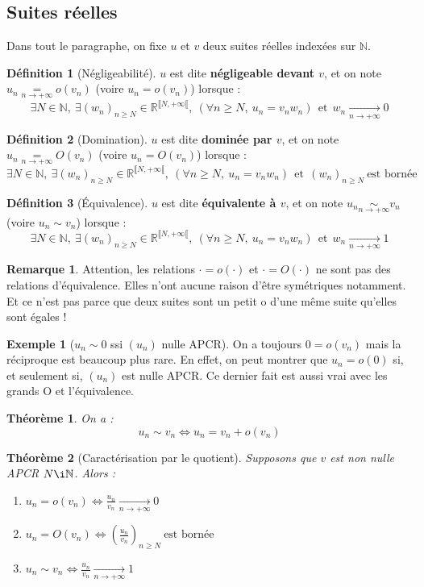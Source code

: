 \documentclass[french]{book}
\newcommand{\N}{\mathbb{N}}
\newcommand{\R}{\mathbb{R}}
\theoremstyle{plain}
\newtheorem{thm}{Théorème}[chapter]
\theoremstyle{definition}
\newtheorem{dfn}{Définition}[chapter]
\newtheorem{exa}{Exemple}[chapter]
\newtheorem{rmq}{Remarque}[chapter]
\theoremstyle{remark}
\begin{document}
\subsection{Suites réelles}
Dans tout le paragraphe, on fixe $u$ et $v$ deux suites réelles indexées sur $\N$.
\begin{dfn}[Négligeabilité]
	$u$ est dite \textbf{négligeable devant $v$}, et on note $u_n\underset{n\to+\infty}{=}o(v_n)$ (voire $u_n=o(v_n)$) lorsque : $$\exists N\in\N,\ \exists(w_n)_{n\geqslant N}\in\R^{\llbracket N,+\infty\llbracket},\ \left(\forall n\geqslant N,\ u_n=v_nw_n\right) \ \ \text{et} \ \ w_n\xrightarrow[n\to+\infty]{} 0$$
\end{dfn}
\begin{dfn}[Domination]
	$u$ est dite \textbf{dominée par $v$}, et on note $u_n\underset{n\to+\infty}{=}O(v_n)$ (voire $u_n=O(v_n)$) lorsque : $$\exists N\in\N,\ \exists(w_n)_{n\geqslant N}\in\R^{\llbracket N,+\infty\llbracket},\ \left(\forall n\geqslant N,\ u_n=v_nw_n\right) \ \ \text{et} \ \ (w_n)_{n\geqslant N} \ \text{est bornée}$$
\end{dfn}
\begin{dfn}[Équivalence]
	$u$ est dite \textbf{équivalente à $v$}, et on note $u_n\underset{n\to+\infty}{\sim}v_n$ (voire $u_n\sim v_n$) lorsque : $$\exists N\in\N,\ \exists(w_n)_{n\geqslant N}\in\R^{\llbracket N,+\infty\llbracket},\ \left(\forall n\geqslant N,\ u_n=v_nw_n\right) \ \ \text{et} \ \ w_n\xrightarrow[n\to+\infty]{} 1$$
\end{dfn}
\begin{rmq}
	Attention, les relations $\cdot=o(\cdot)$ et $\cdot=O(\cdot)$ ne sont pas des relations d'équivalence. Elles n'ont aucune raison d'être symétriques notamment. Et ce n'est pas parce que deux suites sont un petit o d'une même suite qu'elles sont égales !
\end{rmq}
\begin{exa}[$u_n\sim 0$ ssi $(u_n)$ nulle APCR]
	On a toujours $0=o(v_n)$ mais la réciproque est beaucoup plus rare. En effet, on peut montrer que $u_n=o(0)$ si, et seulement si, $(u_n)$ est nulle APCR. Ce dernier fait est aussi vrai avec les grands O et l'équivalence.
\end{exa}
\begin{thm}
	On a : $$u_n\sim v_n \Longleftrightarrow u_n=v_n+o(v_n)$$
\end{thm}
\begin{thm}[Caractérisation par le quotient]
	Supposons que $v$ est non nulle APCR $N\i\N$. Alors :
	\begin{enumerate}
		\item $u_n=o(v_n)\Longleftrightarrow \displaystyle\frac{u_n}{v_n}\xrightarrow[n\to+\infty]{}0$
		\item $u_n=O(v_n)\Longleftrightarrow \displaystyle\left(\frac{u_n}{v_n}\right)_{n\geqslant N} \ \text{est bornée}$
		\item $u_n\sim v_n\Longleftrightarrow \displaystyle\frac{u_n}{v_n}\xrightarrow[n\to+\infty]{}1$
	\end{enumerate}
\end{thm}
\end{document}
